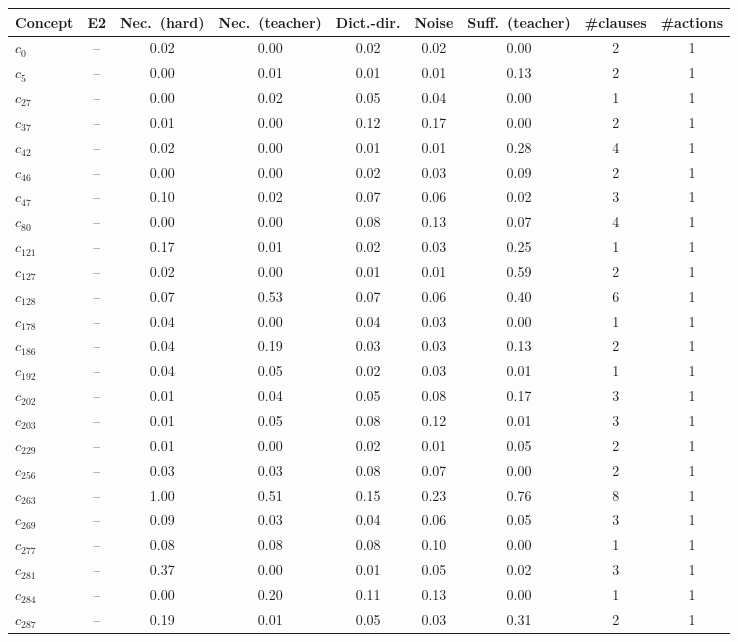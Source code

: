 \begin{tabular}{lcccccccc}
\toprule
Concept & E2 & Nec.\ (hard) & Nec.\ (teacher) & Dict.-dir. & Noise & Suff.\ (teacher) & \#clauses & \#actions \\
\midrule
$c_{0}$ & -- & 0.02 & 0.00 & 0.02 & 0.02 & 0.00 & 2 & 1 \\
$c_{5}$ & -- & 0.00 & 0.01 & 0.01 & 0.01 & 0.13 & 2 & 1 \\
$c_{27}$ & -- & 0.00 & 0.02 & 0.05 & 0.04 & 0.00 & 1 & 1 \\
$c_{37}$ & -- & 0.01 & 0.00 & 0.12 & 0.17 & 0.00 & 2 & 1 \\
$c_{42}$ & -- & 0.02 & 0.00 & 0.01 & 0.01 & 0.28 & 4 & 1 \\
$c_{46}$ & -- & 0.00 & 0.00 & 0.02 & 0.03 & 0.09 & 2 & 1 \\
$c_{47}$ & -- & 0.10 & 0.02 & 0.07 & 0.06 & 0.02 & 3 & 1 \\
$c_{80}$ & -- & 0.00 & 0.00 & 0.08 & 0.13 & 0.07 & 4 & 1 \\
$c_{121}$ & -- & 0.17 & 0.01 & 0.02 & 0.03 & 0.25 & 1 & 1 \\
$c_{127}$ & -- & 0.02 & 0.00 & 0.01 & 0.01 & 0.59 & 2 & 1 \\
$c_{128}$ & -- & 0.07 & 0.53 & 0.07 & 0.06 & 0.40 & 6 & 1 \\
$c_{178}$ & -- & 0.04 & 0.00 & 0.04 & 0.03 & 0.00 & 1 & 1 \\
$c_{186}$ & -- & 0.04 & 0.19 & 0.03 & 0.03 & 0.13 & 2 & 1 \\
$c_{192}$ & -- & 0.04 & 0.05 & 0.02 & 0.03 & 0.01 & 1 & 1 \\
$c_{202}$ & -- & 0.01 & 0.04 & 0.05 & 0.08 & 0.17 & 3 & 1 \\
$c_{203}$ & -- & 0.01 & 0.05 & 0.08 & 0.12 & 0.01 & 3 & 1 \\
$c_{229}$ & -- & 0.01 & 0.00 & 0.02 & 0.01 & 0.05 & 2 & 1 \\
$c_{256}$ & -- & 0.03 & 0.03 & 0.08 & 0.07 & 0.00 & 2 & 1 \\
$c_{263}$ & -- & 1.00 & 0.51 & 0.15 & 0.23 & 0.76 & 8 & 1 \\
$c_{269}$ & -- & 0.09 & 0.03 & 0.04 & 0.06 & 0.05 & 3 & 1 \\
$c_{277}$ & -- & 0.08 & 0.08 & 0.08 & 0.10 & 0.00 & 1 & 1 \\
$c_{281}$ & -- & 0.37 & 0.00 & 0.01 & 0.05 & 0.02 & 3 & 1 \\
$c_{284}$ & -- & 0.00 & 0.20 & 0.11 & 0.13 & 0.00 & 1 & 1 \\
$c_{287}$ & -- & 0.19 & 0.01 & 0.05 & 0.03 & 0.31 & 2 & 1 \\

\end{tabular}
